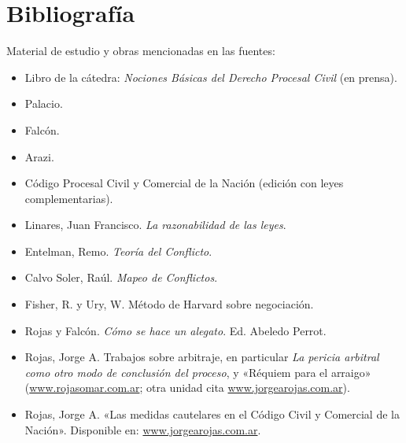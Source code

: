 \documentclass[12pt,oneside]{book}
\begin{document}
\backmatter
\chapter*{Bibliografía}

Material de estudio y obras mencionadas en las fuentes:

\begin{itemize}
\item Libro de la cátedra: \textit{Nociones Básicas del Derecho Procesal Civil} (en prensa).
\item Palacio.
\item Falcón.
\item Arazi.
\item Código Procesal Civil y Comercial de la Nación (edición con leyes complementarias).
\item Linares, Juan Francisco. \textit{La razonabilidad de las leyes}.
\item Entelman, Remo. \textit{Teoría del Conflicto}.
\item Calvo Soler, Raúl. \textit{Mapeo de Conflictos}.
\item Fisher, R. y Ury, W. Método de Harvard sobre negociación.
\item Rojas y Falcón. \textit{Cómo se hace un alegato}. Ed. Abeledo Perrot.
\item Rojas, Jorge A. Trabajos sobre arbitraje, en particular \textit{La pericia arbitral como otro modo de conclusión del proceso}, y «Réquiem para el arraigo» (\url{www.rojasomar.com.ar}; otra unidad cita \url{www.jorgearojas.com.ar}). %
\item Rojas, Jorge A. «Las medidas cautelares en el Código Civil y Comercial de la Nación». Disponible en: \url{www.jorgearojas.com.ar}.
\end{itemize}
\end{document}
